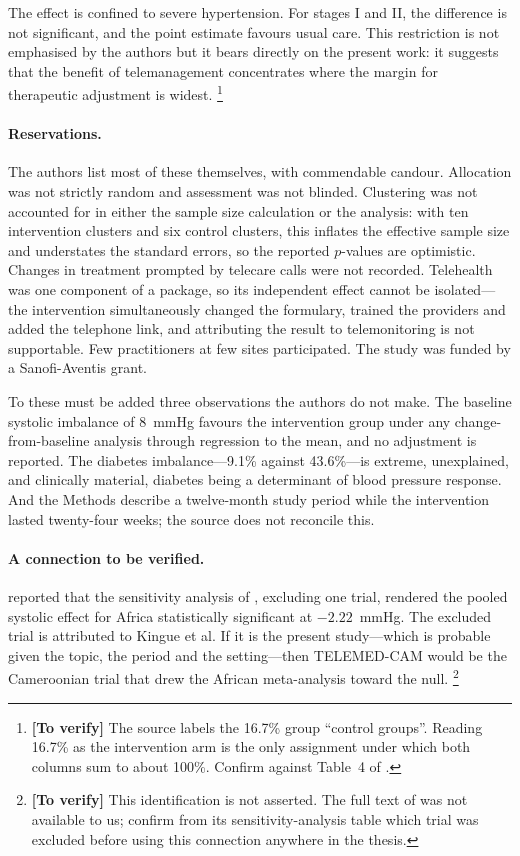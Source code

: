 \documentclass[12pt,a4paper,oneside]{report}
\newcommand{\verify}[1]{\footnote{\textbf{[To verify]} #1}}
\begin{document}
The effect is confined to severe hypertension. For stages I and II, the difference is not significant, and the point estimate favours usual care. This restriction is not emphasised by the authors but it bears directly on the present work: it suggests that the benefit of telemanagement concentrates where the margin for therapeutic adjustment is widest.%
\verify{The source labels the 16.7\% group ``control groups''. Reading 16.7\% as the intervention arm is the only assignment under which both columns sum to about 100\%. Confirm against Table~4 of \textcite{kingue2013}.}

\paragraph{Reservations.} The authors list most of these themselves, with commendable candour. Allocation was not strictly random and assessment was not blinded. Clustering was not accounted for in either the sample size calculation or the analysis: with ten intervention clusters and six control clusters, this inflates the effective sample size and understates the standard errors, so the reported $p$-values are optimistic. Changes in treatment prompted by telecare calls were not recorded. Telehealth was one component of a package, so its independent effect cannot be isolated---the intervention simultaneously changed the formulary, trained the providers and added the telephone link, and attributing the result to telemonitoring is not supportable. Few practitioners at few sites participated. The study was funded by a Sanofi-Aventis grant.

To these must be added three observations the authors do not make. The baseline systolic imbalance of 8~mmHg favours the intervention group under any change-from-baseline analysis through regression to the mean, and no adjustment is reported. The diabetes imbalance---9.1\% against 43.6\%---is extreme, unexplained, and clinically material, diabetes being a determinant of blood pressure response. And the Methods describe a twelve-month study period while the intervention lasted twenty-four weeks; the source does not reconcile this.

\paragraph{A connection to be verified.}  reported that the sensitivity analysis of \textcite{aovare2023}, excluding one trial, rendered the pooled systolic effect for Africa statistically significant at $-2.22$~mmHg. The excluded trial is attributed to Kingue et al. If it is the present study---which is probable given the topic, the period and the setting---then TELEMED-CAM would be the Cameroonian trial that drew the African meta-analysis toward the null.%
\verify{This identification is not asserted. The full text of \textcite{aovare2023} was not available to us; confirm from its sensitivity-analysis table which trial was excluded before using this connection anywhere in the thesis.}
\end{document}
